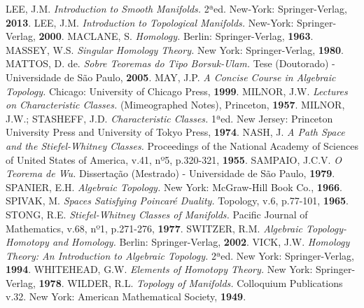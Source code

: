 \documentclass[12pt,oneside]{book} %
\begin{document}
\begin{thebibliography}{99}
	 LEE, J.M. \textit{Introduction to Smooth Manifolds.} 2ªed. New-York: Springer-Verlag, \textbf{2013}.
	 LEE, J.M. \textit{Introduction to Topological Manifolds.} New-York: Springer-Verlag, \textbf{2000}.
	 MACLANE, S. \textit{Homology.} Berlin: Springer-Verlag, \textbf{1963}.
	 MASSEY, W.S. \textit{Singular Homology Theory.} New York: Springer-Verlag, \textbf{1980}.
	 MATTOS, D. de. \textit{Sobre Teoremas do Tipo Borsuk-Ulam.} Tese (Doutorado) - Universidade de São Paulo, \textbf{2005}.
	 MAY, J.P. \textit{A Concise Course in Algebraic Topology.} Chicago: University of Chicago Press, \textbf{1999}.
	 MILNOR, J.W. \textit{Lectures on Characteristic Classes.} (Mimeographed Notes), Princeton, \textbf{1957}.
	 MILNOR, J.W.; STASHEFF, J.D. \textit{Characteristic Classes.} 1ªed. New Jersey: Princeton University Press and University of Tokyo Press, \textbf{1974}.
	 NASH, J. \textit{A Path Space and the Stiefel-Whitney Classes.} Proceedings of the National Academy of Sciences of United States of America, v.41, nº5, p.320-321, \textbf{1955}.
	 SAMPAIO, J.C.V. \textit{O Teorema de Wu.} Dissertação (Mestrado) - Universidade de São Paulo, \textbf{1979}.
	 SPANIER, E.H. \textit{Algebraic Topology.} New York: McGraw-Hill Book Co., \textbf{1966}.
	 SPIVAK, M. \textit{Spaces Satisfying Poincaré Duality.} Topology, v.6, p.77-101, \textbf{1965}.
	 STONG, R.E. \textit{Stiefel-Whitney Classes of Manifolds.} Pacific Journal of Mathematics, v.68, nº1, p.271-276, \textbf{1977}.
	 SWITZER, R.M. \textit{Algebraic Topology-Homotopy and Homology.} Berlin: Springer-Verlag, \textbf{2002}.
	 VICK, J.W. \textit{Homology Theory: An Introduction to Algebraic Topology.} 2ªed. New York: Springer-Verlag, \textbf{1994}.
	 WHITEHEAD, G.W. \textit{Elements of Homotopy Theory.} New York: Springer-Verlag, \textbf{1978}.
	 WILDER, R.L. \textit{Topology of Manifolds.} Colloquium Publications v.32. New York: American Mathematical Society, \textbf{1949}.
	
\end{thebibliography}





\end{document}
